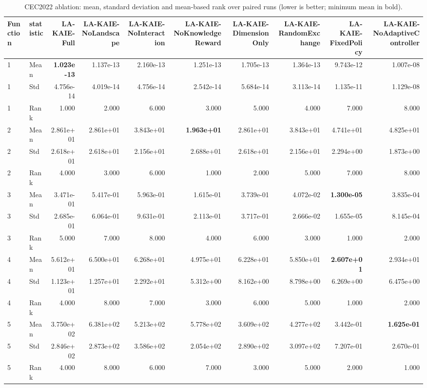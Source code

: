 \begin{table}[t]
\centering
\scriptsize
\caption{CEC2022 ablation: mean, standard deviation and mean-based rank over paired runs (lower is better; minimum mean in bold).}
\label{tab:cec2022_ablation}
\begin{tabular}{llrrrrrrrr}
\hline
Function & statistic & LA-KAIE-Full & LA-KAIE-NoLandscape & LA-KAIE-NoInteraction & LA-KAIE-NoKnowledgeReward & LA-KAIE-DimensionOnly & LA-KAIE-RandomExchange & LA-KAIE-FixedPolicy & LA-KAIE-NoAdaptiveController \\
\hline
1 & Mean & \textbf{1.023e-13} & 1.137e-13 & 2.160e-13 & 1.251e-13 & 1.705e-13 & 1.364e-13 & 9.743e-12 & 1.007e-08 \\
1 & Std & 4.756e-14 & 4.019e-14 & 4.756e-14 & 2.542e-14 & 5.684e-14 & 3.113e-14 & 1.135e-11 & 1.129e-08 \\
1 & Rank & 1.000 & 2.000 & 6.000 & 3.000 & 5.000 & 4.000 & 7.000 & 8.000 \\
2 & Mean & 2.861e+01 & 2.861e+01 & 3.843e+01 & \textbf{1.963e+01} & 2.861e+01 & 3.843e+01 & 4.741e+01 & 4.825e+01 \\
2 & Std & 2.618e+01 & 2.618e+01 & 2.156e+01 & 2.688e+01 & 2.618e+01 & 2.156e+01 & 2.294e+00 & 1.873e+00 \\
2 & Rank & 4.000 & 3.000 & 6.000 & 1.000 & 2.000 & 5.000 & 7.000 & 8.000 \\
3 & Mean & 3.471e-01 & 5.417e-01 & 5.963e-01 & 1.615e-01 & 3.739e-01 & 4.072e-02 & \textbf{1.300e-05} & 3.835e-04 \\
3 & Std & 2.685e-01 & 6.064e-01 & 9.631e-01 & 2.113e-01 & 3.717e-01 & 2.666e-02 & 1.655e-05 & 8.145e-04 \\
3 & Rank & 5.000 & 7.000 & 8.000 & 4.000 & 6.000 & 3.000 & 1.000 & 2.000 \\
4 & Mean & 5.612e+01 & 6.500e+01 & 6.268e+01 & 4.975e+01 & 6.228e+01 & 5.850e+01 & \textbf{2.607e+01} & 2.934e+01 \\
4 & Std & 1.123e+01 & 1.257e+01 & 2.292e+01 & 5.312e+00 & 8.162e+00 & 8.798e+00 & 6.269e+00 & 6.475e+00 \\
4 & Rank & 4.000 & 8.000 & 7.000 & 3.000 & 6.000 & 5.000 & 1.000 & 2.000 \\
5 & Mean & 3.750e+02 & 6.381e+02 & 5.213e+02 & 5.778e+02 & 3.609e+02 & 4.277e+02 & 3.442e-01 & \textbf{1.625e-01} \\
5 & Std & 2.846e+02 & 2.873e+02 & 3.586e+02 & 2.054e+02 & 2.890e+02 & 3.097e+02 & 7.207e-01 & 2.670e-01 \\
5 & Rank & 4.000 & 8.000 & 6.000 & 7.000 & 3.000 & 5.000 & 2.000 & 1.000 \\

\end{tabular}
\end{table}
